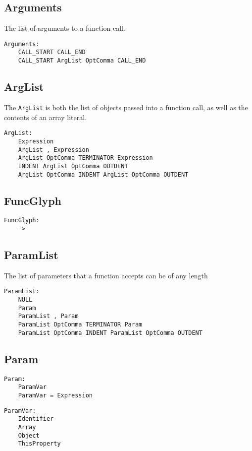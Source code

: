 \documentclass[10pt]{report}
\begin{document}
\subsection{Arguments}

The list of arguments to a function call.
\begin{verbatim}
Arguments:
    CALL_START CALL_END
    CALL_START ArgList OptComma CALL_END
\end{verbatim}

\subsection{ArgList}

The \texttt{ArgList} is both the list of objects passed into a function call, as well as the contents of an array literal.
\begin{verbatim}
ArgList:
    Expression
    ArgList , Expression
    ArgList OptComma TERMINATOR Expression
    INDENT ArgList OptComma OUTDENT
    ArgList OptComma INDENT ArgList OptComma OUTDENT
\end{verbatim}

\subsection{FuncGlyph}

\begin{verbatim}
FuncGlyph:
    ->
\end{verbatim}

\subsection{ParamList}
The list of parameters that a function accepts can be of any length
\begin{verbatim}
ParamList:
    NULL
    Param
    ParamList , Param
    ParamList OptComma TERMINATOR Param
    ParamList OptComma INDENT ParamList OptComma OUTDENT
\end{verbatim}

\subsection{Param}
\begin{verbatim}
Param:
    ParamVar
    ParamVar = Expression
\end{verbatim}

\begin{verbatim}
ParamVar:
    Identifier
    Array
    Object
    ThisProperty
\end{verbatim}
\end{document}
